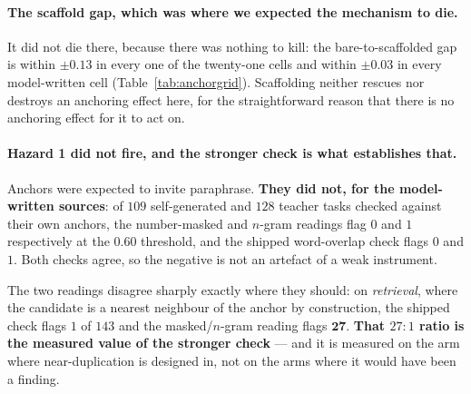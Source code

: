 \paragraph{The scaffold gap, which was where we expected the mechanism to die.} It did not die
there, because there was nothing to kill: the bare-to-scaffolded gap is within $\pm 0.13$ in
every one of the twenty-one cells and within $\pm 0.03$ in every model-written cell
(Table~\ref{tab:anchorgrid}). Scaffolding neither rescues nor destroys an anchoring effect
here, for the straightforward reason that there is no anchoring effect for it to act on.

\paragraph{Hazard 1 did not fire, and the stronger check is what establishes that.} Anchors
were expected to invite paraphrase. \textbf{They did not, for the model-written sources}: of
$109$ self-generated and $128$ teacher tasks checked against their own anchors, the
number-masked and $n$-gram readings flag $0$ and $1$ respectively at the $0.60$ threshold, and
the shipped word-overlap check flags $0$ and $1$. Both checks agree, so the negative is not an
artefact of a weak instrument.

The two readings disagree sharply exactly where they should: on \emph{retrieval}, where the
candidate is a nearest neighbour of the anchor by construction, the shipped check flags $1$ of
$143$ and the masked/$n$-gram reading flags $\mathbf{27}$. \textbf{That $27{:}1$ ratio is the
measured value of the stronger check} --- and it is measured on the arm where near-duplication
is designed in, not on the arms where it would have been a finding.

